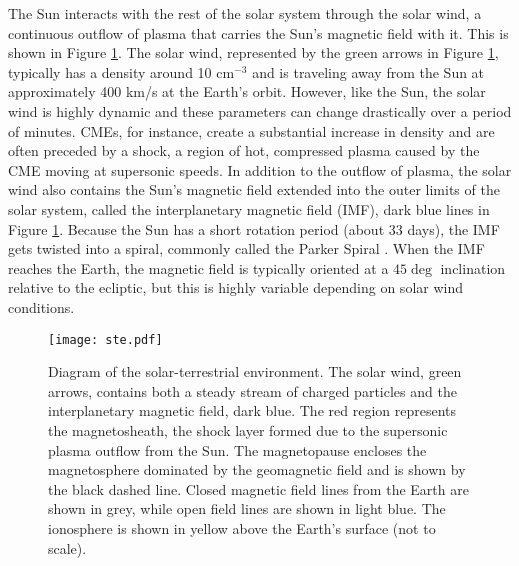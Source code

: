 The Sun interacts with the rest of the solar system through the solar wind, a continuous outflow of plasma that carries the Sun's magnetic field with it.  This is shown in Figure \ref{fig:ste}.  The solar wind, represented by the green arrows in Figure \ref{fig:ste}, typically has a density around 10 cm\(^{-3}\) and is traveling away from the Sun at approximately 400 km/s at the Earth's orbit.  However, like the Sun, the solar wind is highly dynamic and these parameters can change drastically over a period of minutes.  CMEs, for instance, create a substantial increase in density and are often preceded by a shock, a region of hot, compressed plasma caused by the CME moving at supersonic speeds.  In addition to the outflow of plasma, the solar wind also contains the Sun's magnetic field extended into the outer limits of the solar system, called the interplanetary magnetic field (IMF), dark blue lines in Figure \ref{fig:ste}.  Because the Sun has a short rotation period (about 33 days), the IMF gets twisted into a spiral, commonly called the Parker Spiral \citep{Parker1958}.  When the IMF reaches the Earth, the magnetic field is typically oriented at a \(45\deg\) inclination relative to the ecliptic, but this is highly variable depending on solar wind conditions.

\begin{figure}
	\centering
	\texttt{[image: ste.pdf]}
	\caption[Solar-terrestrial environment]{Diagram of the solar-terrestrial environment.  The solar wind, green arrows, contains both a steady stream of charged particles and the interplanetary magnetic field, dark blue.  The red region represents the magnetosheath, the shock layer formed due to the supersonic plasma outflow from the Sun.  The magnetopause encloses the magnetosphere dominated by the geomagnetic field and is shown by the black dashed line.  Closed magnetic field lines from the Earth are shown in grey, while open field lines are shown in light blue.  The ionosphere is shown in yellow above the Earth's surface (not to scale).}
	\label{fig:ste}
\end{figure}

